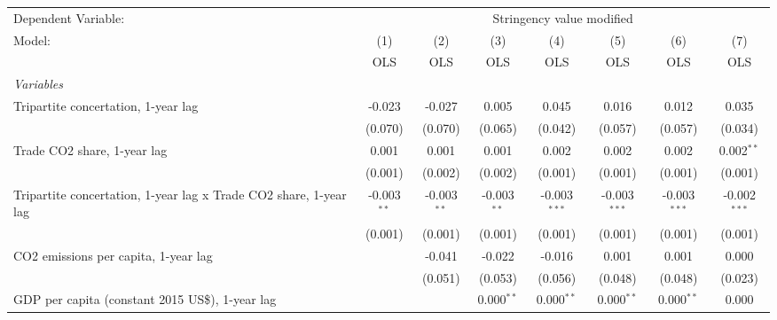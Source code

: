 
\begingroup
\centering
\begin{tabular}{lccccccc}
   \toprule
   Dependent Variable: & \multicolumn{7}{c}{Stringency value modified}\\
   Model:                                                            & (1)           & (2)           & (3)           & (4)            & (5)            & (6)            & (7)\\  
                                                                     &  OLS          & OLS           & OLS           & OLS            & OLS            & OLS            & OLS\\  
   \midrule
   \emph{Variables}\\
   Tripartite concertation, 1-year lag                               & -0.023        & -0.027        & 0.005         & 0.045          & 0.016          & 0.012          & 0.035\\   
                                                                     & (0.070)       & (0.070)       & (0.065)       & (0.042)        & (0.057)        & (0.057)        & (0.034)\\   
   Trade CO2 share, 1-year lag                                       & 0.001         & 0.001         & 0.001         & 0.002          & 0.002          & 0.002          & 0.002$^{**}$\\   
                                                                     & (0.001)       & (0.002)       & (0.002)       & (0.001)        & (0.001)        & (0.001)        & (0.001)\\   
   Tripartite concertation, 1-year lag x Trade CO2 share, 1-year lag & -0.003$^{**}$ & -0.003$^{**}$ & -0.003$^{**}$ & -0.003$^{***}$ & -0.003$^{***}$ & -0.003$^{***}$ & -0.002$^{***}$\\   
                                                                     & (0.001)       & (0.001)       & (0.001)       & (0.001)        & (0.001)        & (0.001)        & (0.001)\\   
   CO2 emissions per capita, 1-year lag                              &               & -0.041        & -0.022        & -0.016         & 0.001          & 0.001          & 0.000\\   
                                                                     &               & (0.051)       & (0.053)       & (0.056)        & (0.048)        & (0.048)        & (0.023)\\   
   GDP per capita (constant 2015 US\$), 1-year lag                   &               &               & 0.000$^{**}$  & 0.000$^{**}$   & 0.000$^{**}$   & 0.000$^{**}$   & 0.000\\   

\end{tabular}
